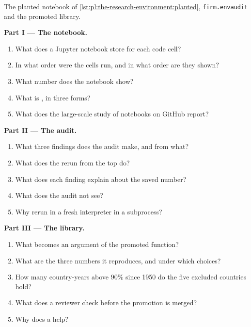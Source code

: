\begin{problem}\label{pb:pl:the-research-environment:1}
The planted notebook of \cref{lst:pl:the-research-environment:planted}, \texttt{firm.envaudit} and the promoted library.

\medskip\noindent\textbf{Part I --- The notebook.}
\begin{enumerate}
\item What does a Jupyter notebook store for each code cell?
\item In what order were the cells run, and in what order are they shown?
\item What number does the notebook show?
\item What is , in three forms?
\item What does the large-scale study of notebooks on GitHub report?
\end{enumerate}

\medskip\noindent\textbf{Part II --- The audit.}
\begin{enumerate}[resume]
\item What three findings does the audit make, and from what?
\item What does the rerun from the top do?
\item What does each finding explain about the saved number?
\item What does the audit not see?
\item Why rerun in a fresh interpreter in a subprocess?
\end{enumerate}

\medskip\noindent\textbf{Part III --- The library.}
\begin{enumerate}[resume]
\item What becomes an argument of the promoted function?
\item What are the three numbers it reproduces, and under which choices?
\item How many country-years above 90\% since 1950 do the five excluded countries hold?
\item What does a reviewer check before the promotion is merged?
\item Why does a  help?
\end{enumerate}


\end{problem}
